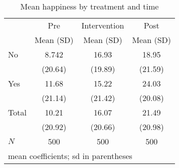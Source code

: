 \begin{table}[htbp]\centering
\caption{Mean happiness by treatment and time}
\begin{tabular}{l*{3}{c}}
\hline\hline
            &\multicolumn{1}{c}{Pre}&\multicolumn{1}{c}{Intervention}&\multicolumn{1}{c}{Post}\\
            &   Mean (SD)&   Mean (SD)&   Mean (SD)\\
\hline
No          &       8.742&       16.93&       18.95\\
            &     (20.64)&     (19.89)&     (21.59)\\
[1em]
Yes         &       11.68&       15.22&       24.03\\
            &     (21.14)&     (21.42)&     (20.08)\\
[1em]
Total       &       10.21&       16.07&       21.49\\
            &     (20.92)&     (20.66)&     (20.98)\\
\hline
\(N\)       &         500&         500&         500\\
\hline\hline
\multicolumn{4}{l}{\footnotesize mean coefficients; sd in parentheses}\\
\end{tabular}
\end{table}
